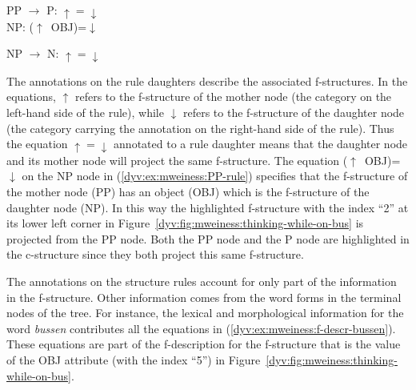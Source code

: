 \documentclass[output=paper]{langsci/langscibook}
\begin{document}
\ea\label{dyv:ex:mweiness:PP-rule}
{\sffamily 
PP	$\rightarrow$	P: $\uparrow=\downarrow$ \\
\hspace{2.3em} NP: ($\uparrow$~OBJ)=$\downarrow$
}
\z

\ea\label{dyv:ex:mweiness:NP-rule}
{\sffamily 
NP	$\rightarrow$	N: $\uparrow=\downarrow$ \\
}
\z

The annotations on the rule daughters describe the associated f-structures.
In the equations, \textsf{$\uparrow$} refers to the f-structure of the mother node (the category on the left-hand side of the rule), while \textsf{$\downarrow$} refers to the f-structure of the daughter node (the category carrying the annotation on the right-hand side of the rule).
Thus the equation \textsf{$\uparrow=\downarrow$} annotated to a rule daughter means that the daughter node and its mother node will project the same f-structure.
The equation \textsf{($\uparrow$~OBJ)=$\downarrow$} on the \textsf{NP} node in (\ref{dyv:ex:mweiness:PP-rule}) specifies that the f-structure of the mother node (\textsf{PP}) has an object (\textsf{OBJ}) which is the f-structure of the daughter node (\textsf{NP}).
In this way the highlighted f-structure with the index ``\textsf{2}'' at its lower left corner in Figure~\ref{dyv:fig:mweiness:thinking-while-on-bus} is projected from the \textsf{PP} node.
Both the \textsf{PP} node and the \textsf{P} node are highlighted in the c-structure since they both project this same f-structure.

The annotations on the  structure rules account for only part of the information in the f-structure.
Other information comes from the word forms in the terminal nodes of the tree.
For instance, the lexical and morphological information for the word \textit{bussen} contributes all the equations in (\ref{dyv:ex:mweiness:f-descr-bussen}).
These equations are part of the f-description for the f-structure that is the value of the \textsf{OBJ} attribute (with the index ``\textsf{5}'') in Figure~\ref{dyv:fig:mweiness:thinking-while-on-bus}.

\end{document}
